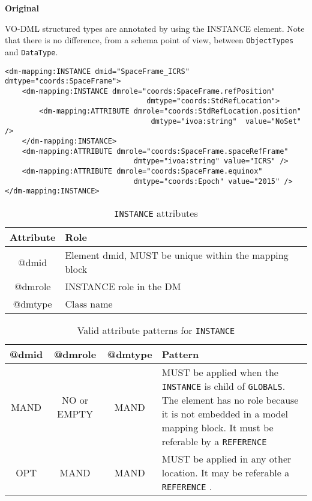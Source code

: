        
\newpage
\textbf{Original}


VO-DML structured types are annotated by using the INSTANCE
element. Note that there is no difference, from a schema point of view,
between \texttt{ObjectTypes} and \texttt{DataType}.


 \begin{lstlisting}[frame=single,caption={INSTANCE child of GLOBALS},style=XML,basicstyle=\tiny]
<dm-mapping:INSTANCE dmid="SpaceFrame_ICRS" dmtype="coords:SpaceFrame">
	<dm-mapping:INSTANCE dmrole="coords:SpaceFrame.refPosition"
                                 dmtype="coords:StdRefLocation">
		<dm-mapping:ATTRIBUTE dmrole="coords:StdRefLocation.position" 
		                          dmtype="ivoa:string"  value="NoSet" />
	</dm-mapping:INSTANCE>
	<dm-mapping:ATTRIBUTE dmrole="coords:SpaceFrame.spaceRefFrame" 
	                          dmtype="ivoa:string" value="ICRS" />
	<dm-mapping:ATTRIBUTE dmrole="coords:SpaceFrame.equinox" 
	                          dmtype="coords:Epoch"	value="2015" />
</dm-mapping:INSTANCE>
\end{lstlisting}


\begin{table}[!htbp]
\small
\centering
\begin{tabulary}{\linewidth}{|c|J|}       
       \hline 
            \textbf{Attribute} & 
            \textbf {Role}\\
       \hline         \hline  
            @dmid & 
            Element dmid, MUST be unique within the mapping block  \\
        \hline 
            @dmrole & 
            INSTANCE role in the DM \\
        \hline 
            @dmtype & 
            Class name \\
        \hline 
     \end{tabulary}
     \caption{\texttt{INSTANCE} attributes} 
     \label{tbl:instance-att}
 \end{table}

\begin{table}[!htbp]
\small
\centering
\begin{tabulary}{\linewidth}{|c|c|c|J|}
    \hline 
        \textbf{@dmid} &
        \textbf{@dmrole} &
        \textbf{@dmtype} &
        \textbf{Pattern}\\
    \hline      \hline  
        MAND &           
        NO or EMPTY&           
        MAND &           
        MUST be applied when the  \texttt{INSTANCE} is child of \texttt{GLOBALS}. The element has no role because it is not embedded in a model mapping block. It must be referable by a \texttt{REFERENCE}  \\
    \hline   
        OPT &           
        MAND &           
        MAND &           
        MUST be applied in any other location. It may be referable a \texttt{REFERENCE} . \\
   \hline 
\end{tabulary}
     \caption{Valid attribute patterns for  \texttt{INSTANCE}} 
     \label{tbl:instance-pattern}
 \end{table}


